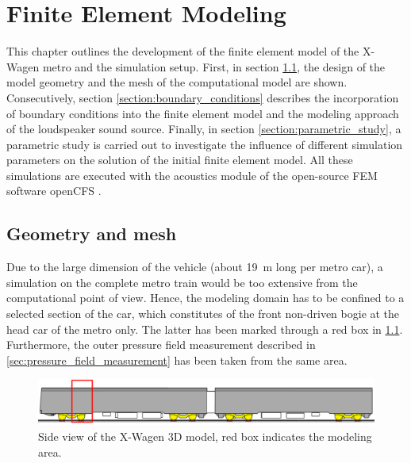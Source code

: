 \chapter{Finite Element Modeling}
\label{chap:FEM}

This chapter outlines the development of the finite element model of the X-Wagen metro and the simulation setup. First, in section \ref{section:geometry}, the design of the model geometry and the mesh of the computational model are shown. Consecutively, section \ref{section:boundary_conditions} describes the incorporation of boundary conditions into the finite element model and the modeling approach of the loudspeaker sound source. Finally, in section \ref{section:parametric_study}, a parametric study is carried out to investigate the influence of different simulation parameters on the solution of the initial finite element model. All these simulations are executed with the acoustics module of the open-source FEM software openCFS \cite{opencfs}.


\section{Geometry and mesh}
\label{section:geometry}

Due to the large dimension of the vehicle (about \SI{19}{\meter} long per metro car), a simulation on the complete metro train would be too extensive from the computational point of view. Hence, the modeling domain has to be confined to a selected section of the car, which constitutes of the front non-driven bogie at the head car of the metro only. The latter has been marked through a red box in \cref{fig:red_box}. Furthermore, the outer pressure field measurement described in \cref{sec:pressure_field_measurement} has been taken from the same area.

\begin{figure}
	\centering
	\includegraphics[width=\textwidth]{fig/chap4/geometry/model_area.png}
	\caption{Side view of the X-Wagen 3D model, red box indicates the modeling area.}
	\label{fig:red_box}
\end{figure}

